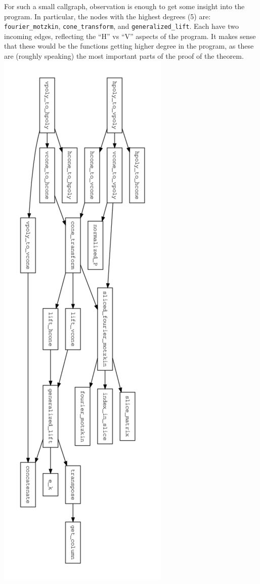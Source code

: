 For such a small callgraph, observation is enough to get some insight into the program.  In particular, the nodes with the highest degrees (5) are: \\
\texttt{fourier\_motzkin}, \texttt{cone\_transform}, and \texttt{generalized\_lift}.  Each have two incoming edges, reflecting the ``H'' vs ``V'' aspects of the program.  It makes sense that these would be the functions getting higher degree in the program, as these are (roughly speaking) the most important parts of the proof of the theorem.
\includegraphics[keepaspectratio,width=\textwidth,height=\textheight]{../img/callgraph.pdf}

